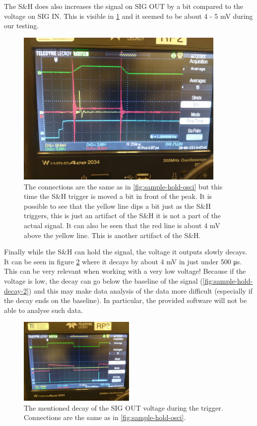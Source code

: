 \documentclass[a4paper, 10pt]{article}
\begin{document}
\newpage

The S\&H does also increases the signal on SIG OUT by a bit compared to the voltage on SIG IN.
This is visible in \cref{fig:sample-hold-osci-2} and it seemed to be about 4 - 5 \si{\milli\volt} during our testing.

\begin{figure}[H]
    \centering
    \includegraphics[width=0.9\textwidth]{./images/sample-hold-osci-2.jpg}
    \caption{The connections are the same as in \cref{fig:sample-hold-osci} but this time the S\&H trigger is moved a bit in front of the peak. It is possible to see that the yellow line dips a bit just as the S\&H triggers, this is just an artifact of the S\&H it is not a part of the actual signal. It can also be seen that the red line is about 4 \si{\milli\volt} above the yellow line. This is another artifact of the S\&H.}
    \label{fig:sample-hold-osci-2}
\end{figure}

Finally while the S\&H can hold the signal, the voltage it outputs slowly decays.
It can be seen in figure \cref{fig:sample-hold-decay} where it decays by about 4 \si{\milli\volt} in just under 500 \si{\micro\second}.
This can be very relevant when working with a very low voltage!
Because if the voltage is low, the decay can go below the baseline of the signal (\cref{fig:sample-hold-decay-2}) and this may make data analysis of the data more difficult (especially if the decay ends on the baseline).
In particular, the provided software will not be able to analyse such data.

\begin{figure}[H]
    \centering
    \includegraphics[width=0.5\textwidth]{./images/sample-hold-decay.jpg}
    \caption{The mentioned decay of the SIG OUT voltage during the trigger. Connections are the same as in \cref{fig:sample-hold-osci}.}
    \label{fig:sample-hold-decay}
\end{figure}
\end{document}

